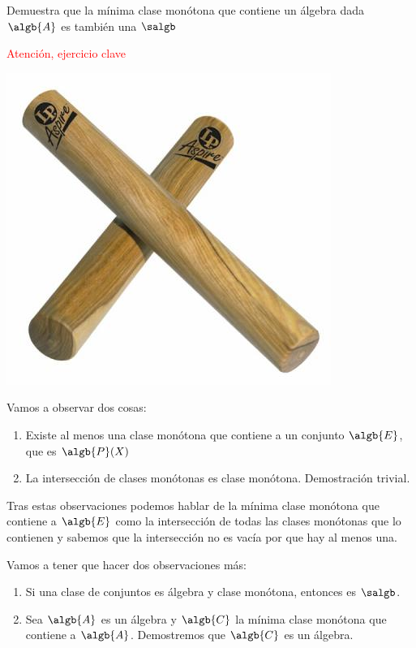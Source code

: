 \begin{problem}[14]
Demuestra que la mínima clase monótona que contiene un álgebra dada $\algb{A}$ es también una $\salgb$

\solution
\textcolor{red}{Atención, ejercicio clave}
\begin{center}
\includegraphics[scale=0.5]{img/clave.jpg}
\end{center}

Vamos a observar dos cosas:
\begin{enumerate}
\item Existe al menos una clase monótona que contiene a un conjunto $\algb{E}$, que es $\algb{P}(X)$
\item La intersección de clases monótonas es clase monótona. Demostración trivial.
\end{enumerate}

Tras estas observaciones podemos hablar de la mínima clase monótona que contiene a $\algb{E}$ como la intersección de todas las clases monótonas que lo contienen y sabemos que la intersección no es vacía por que hay al menos una.

Vamos a tener que hacer dos observaciones más:
\begin{enumerate}
\item Si una clase de conjuntos es álgebra y clase monótona, entonces es $\salgb$.
\item Sea $\algb{A}$ es un álgebra y $\algb{C}$ la mínima clase monótona que contiene a $\algb{A}$. Demostremos que $\algb{C}$ es un álgebra.
\end{enumerate}


\end{problem}
